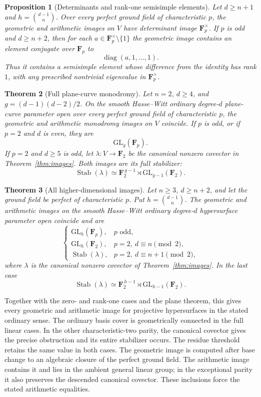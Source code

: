 \documentclass[11pt]{article}
\newtheorem{theorem}{Theorem}[section]
\newtheorem{proposition}[theorem]{Proposition}
\begin{document}
\begin{proposition}[Determinants and rank-one semisimple elements]\label{prop:determinant-reflections}
Let $d\ge n+1$ and $h=\binom{d-1}{n}$. Over every perfect ground field of characteristic $p$, the geometric and arithmetic images on $V$ have determinant image $\mathbf F_p^\times$. If $p$ is odd and $d\ge n+2$, then for each $a\in\mathbf F_p^\times\setminus\{1\}$ the geometric image contains an element conjugate over $\mathbf F_p$ to
\[
\operatorname{diag}(a,1,\ldots,1).
\]
Thus it contains a semisimple element whose difference from the identity has rank $1$, with any prescribed nontrivial eigenvalue in $\mathbf F_p^\times$.
\end{proposition}

\begin{theorem}[Full plane-curve monodromy]\label{thm:plane-images}
Let $n=2$, $d\ge4$, and $g=(d-1)(d-2)/2$. On the smooth Hasse--Witt ordinary degree-$d$ plane-curve parameter open over every perfect ground field of characteristic $p$, the geometric and arithmetic monodromy images on $V$ coincide. If $p$ is odd, or if $p=2$ and $d$ is even, they are
\[
\mathrm{GL}_{g}(\mathbf F_p).
\]
If $p=2$ and $d\ge5$ is odd, let $\lambda:V\to\mathbf F_2$ be the canonical nonzero covector in Theorem~\ref{thm:images}. Both images are its full stabilizer:
\[
\operatorname{Stab}(\lambda)
\simeq \mathbf F_2^{\,g-1}\rtimes\mathrm{GL}_{g-1}(\mathbf F_2).
\]
\end{theorem}

\begin{theorem}[All higher-dimensional images]\label{thm:higher-images}
Let $n\ge3$, $d\ge n+2$, and let the ground field be perfect of characteristic $p$. Put $h=\binom{d-1}{n}$. The geometric and arithmetic images on the smooth Hasse--Witt ordinary degree-$d$ hypersurface parameter open coincide and are
\[
\begin{cases}
\mathrm{GL}_h(\mathbf F_p),&p\text{ odd},\\
\mathrm{GL}_h(\mathbf F_2),&p=2,\ d\equiv n\pmod2,\\
\operatorname{Stab}(\lambda),&p=2,\ d\equiv n+1\pmod2,
\end{cases}
\]
where $\lambda$ is the canonical nonzero covector of Theorem~\ref{thm:images}. In the last case
\[
\operatorname{Stab}(\lambda)\simeq
\mathbf F_2^{\,h-1}\rtimes\mathrm{GL}_{h-1}(\mathbf F_2).
\]
\end{theorem}

Together with the zero- and rank-one cases and the plane theorem, this gives every geometric and arithmetic image for projective hypersurfaces in the stated ordinary sense. The ordinary basis cover is geometrically connected in the full linear cases. In the other characteristic-two parity, the canonical covector gives the precise obstruction and its entire stabilizer occurs. The residue threshold retains the same value in both cases. The geometric image is computed after base change to an algebraic closure of the perfect ground field. The arithmetic image contains it and lies in the ambient general linear group; in the exceptional parity it also preserves the descended canonical covector. These inclusions force the stated arithmetic equalities.
\end{document}
